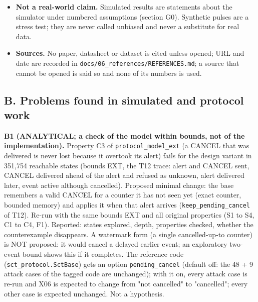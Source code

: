 \begin{itemize}
\item \textbf{Not a real-world claim.} Simulated results are statements about the simulator under numbered assumptions (section G0). Synthetic pulses are a stress test; they are never called unbiased and never a substitute for real data.
\item \textbf{Sources.} No paper, datasheet or dataset is cited unless opened; URL and date are recorded in \texttt{docs/06\_references/REFERENCES.md}; a source that cannot be opened is said so and none of its numbers is used.
\end{itemize}

\subsection*{B. Problems found in simulated and protocol work}

\textbf{B1 (ANALYTICAL; a check of the model within bounds, not of the implementation).} Property C3 of \texttt{protocol\_model\_ext} (a CANCEL that was delivered is never lost because it overtook its alert) fails for the design variant in 351,754 reachable states (bounds EXT, the T12 trace: alert and CANCEL sent, CANCEL delivered ahead of the alert and refused as unknown, alert delivered later, event active although cancelled). Proposed minimal change: the base remembers a valid CANCEL for a counter it has not seen yet (exact counter, bounded memory) and applies it when that alert arrives (\texttt{keep\_pending\_cancel} of T12). Re-run with the same bounds EXT and all original properties (S1 to S4, C1 to C4, F1). Reported: states explored, depth, properties checked, whether the counterexample disappears. A watermark form (a single cancelled-up-to counter) is NOT proposed: it would cancel a delayed earlier event; an exploratory two-event bound shows this if it completes. The reference code (\texttt{sct\_protocol.SctBase}) gets an option \texttt{pending\_cancel} (default off: the 48 + 9 attack cases of the tagged code are unchanged); with it on, every attack case is re-run and X06 is expected to change from "not cancelled" to "cancelled"; every other case is expected unchanged. Not a hypothesis.

